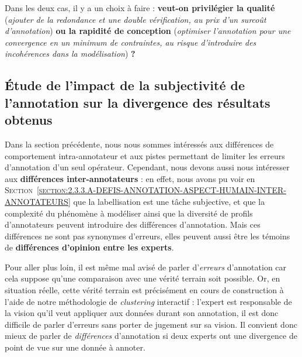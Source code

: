			\begin{leftBarAuthorOpinion}
				Dans les deux cas, il y a un choix à faire : \textbf{veut-on privilégier la qualité} (\textit{ajouter de la redondance et une double vérification, au prix d'un surcoût d'annotation}) \textbf{ou la rapidité de conception} (\textit{optimiser l'annotation pour une convergence en un minimum de contraintes, au risque d'introduire des incohérences dans la modélisation}) \textbf{?}
			\end{leftBarAuthorOpinion}
		
	\subsection{Étude de l'impact de la subjectivité de l'annotation sur la divergence des résultats obtenus}
	\label{section:4.6.2-ETUDE-ROBUSTESSE-SUBJECTIVITE-ANNOTATION-ET-DIVERGENCE}
		
		Dans la section précédente, nous nous sommes intéressés aux différences de comportement intra-annotateur et aux pistes permettant de limiter les erreurs d'annotation d'un seul opérateur.
		Cependant, nous devons aussi nous intéresser aux \textbf{différences inter-annotateurs} :
		en effet, nous avons pu voir en \textsc{Section~\ref{section:2.3.3.A-DEFIS-ANNOTATION-ASPECT-HUMAIN-INTER-ANNOTATEURS}} que la labellisation est une tâche subjective, et que la complexité du phénomène à modéliser ainsi que la diversité de profils d'annotateurs peuvent introduire des différences d'annotation.
		Mais ces différences ne sont pas synonymes d'erreurs, elles peuvent aussi être les témoins de \textbf{différences d'opinion entre les experts}.
		\begin{leftBarAuthorOpinion}
			Pour aller plus loin, il est même mal avisé de parler d'\textit{erreurs} d'annotation car cela suppose qu'une comparaison avec une vérité terrain soit possible.
			Or, en situation réelle, cette vérité terrain est précisément en cours de construction à l'aide de notre méthodologie de \textit{clustering} interactif : l'expert est responsable de la vision qu'il veut appliquer aux données durant son annotation, il est donc difficile de parler d'erreurs sans porter de jugement sur sa vision.
			Il convient donc mieux de parler de \textit{différences} d'annotation si deux experts ont une divergence de point de vue sur une donnée à annoter.
		\end{leftBarAuthorOpinion}
		

